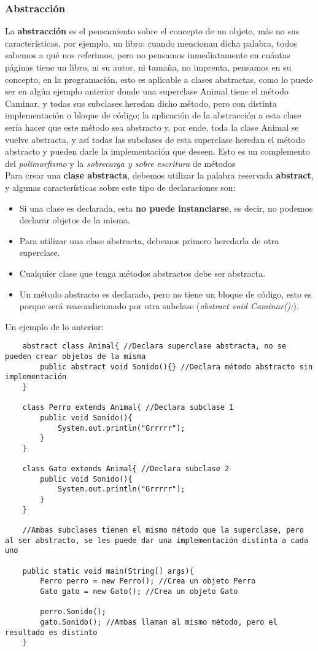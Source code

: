 \subsubsection{Abstracción}
La \textbf{abstracción} es el pensamiento sobre el concepto de un objeto, más no sus características, por ejemplo, un libro: cuando mencionan dicha palabra, todos sabemos a qué nos referimos, pero no pensamos inmediatamente en cuántas páginas tiene un libro, ni su autor, ni tamaña, no imprenta, pensamos en su concepto, en la programación, esto es aplicable a clases abstractas, como lo puede ser en algún ejemplo anterior donde una superclase Animal tiene el método Caminar, y todas sus subclases heredan dicho método, pero con distinta implementación o bloque de código; la aplicación de la abstracción a esta clase sería hacer que este método sea abstracto y, por ende, toda la clase Animal se vuelve abstracta, y así todas las subclases de esta superclase heredan el método abstracto y pueden darle la implementación que deseen. Esto es un complemento del \textit{polimorfismo} y la \textit{sobrecarga y sobre escritura} de métodos\\
Para crear una \textbf{clase abstracta}, debemos utilizar la palabra reservada \textbf{abstract}, y algunas características sobre este tipo de declaraciones son:
\begin{itemize}
    \item Si una clase es declarada, esta \textbf{no puede instanciarse}, es decir, no podemos declarar objetos de la misma.
    \item Para utilizar una clase abstracta, debemos primero heredarla de otra superclase.
    \item Cualquier clase que tenga métodos abstractos debe ser abstracta.
    \item Un método abstracto es declarado, pero no tiene un bloque de código, esto es porque será reacondicionado por otra subclase (\textit{abstract void Caminar();}).
\end{itemize}
Un ejemplo de lo anterior:
\begin{lstlisting}
    abstract class Animal{ //Declara superclase abstracta, no se pueden crear objetos de la misma
        public abstract void Sonido(){} //Declara método abstracto sin implementación
    }
    
    class Perro extends Animal{ //Declara subclase 1
        public void Sonido(){
            System.out.println("Grrrrr");
        }
    }
    
    class Gato extends Animal{ //Declara subclase 2
        public void Sonido(){
            System.out.println("Grrrrr");
        }
    }
    
    //Ambas subclases tienen el mismo método que la superclase, pero al ser abstracto, se les puede dar una implementación distinta a cada uno
    
    public static void main(String[] args){
        Perro perro = new Perro(); //Crea un objeto Perro
        Gato gato = new Gato(); //Crea un objeto Gato
        
        perro.Sonido();
        gato.Sonido(); //Ambas llaman al mismo método, pero el resultado es distinto
    }
\end{lstlisting}



